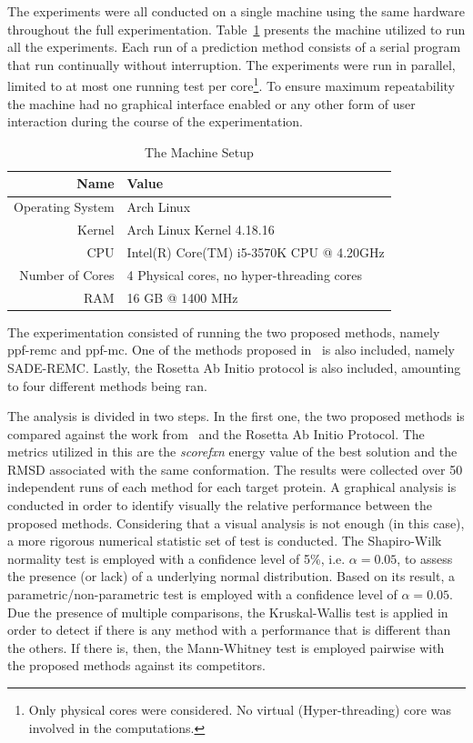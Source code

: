 The experiments were all conducted on a single machine using the same hardware
throughout the full experimentation. Table~\ref{tab:machine-setup}
presents the machine utilized to run all the experiments. Each run of a
prediction method consists of a serial program that run continually without
interruption. The experiments were run in parallel, limited to at most one
running test per core\footnote{Only physical cores were considered. No virtual
(Hyper-threading) core was involved in the computations.}. To ensure maximum
repeatability the machine had no graphical interface enabled or any other form
of user interaction during the course of the experimentation.

\begin{table}[th]
    \centering
    \begin{tabular}{r|l} \hline \hline
        Name & Value \\ \hline \hline
        Operating System & Arch Linux \\ \hline
        Kernel &  Arch Linux Kernel 4.18.16 \\ \hline
        CPU & Intel(R) Core(TM) i5-3570K CPU @ 4.20GHz \\ \hline
        Number of Cores & 4 Physical cores, no hyper-threading cores \\ \hline
        RAM & 16 GB @ 1400 MHz \\ \hline \hline
    \end{tabular}
    \caption{The Machine Setup}
    \label{tab:machine-setup}
\end{table}

The experimentation consisted of running the two proposed methods, namely
ppf-remc and ppf-mc. One of the methods proposed
in~\cite{silva2019self} is also included, namely SADE-REMC.
Lastly, the Rosetta Ab Initio protocol is also included, amounting to four
different methods being ran.

The analysis is divided in two steps. In the first one, the two proposed methods
is compared against the work from~ and the Rosetta Ab Initio
Protocol.
The metrics utilized in this are the \textit{scorefxn} energy value of the
best solution and the \ac{RMSD} associated with the same conformation. The
results were collected over 50 independent runs of each method for each target
protein. A graphical analysis is conducted in order to identify visually the
relative performance between the proposed methods. Considering that a visual
analysis is not enough (in this case), a more rigorous numerical statistic set
of test is conducted. The Shapiro-Wilk~\cite{wilk1968joint} normality test is
employed with a confidence level of 5\%, i.e. $\alpha = 0.05$, to assess the
presence (or lack) of a underlying normal distribution. Based on its result, a
parametric/non-parametric test is employed with a confidence level of $\alpha =
0.05$. Due the presence of multiple comparisons, the Kruskal-Wallis test is
applied in order to detect if there is any method with a performance that
is different than the others. If there is, then, the Mann-Whitney test is
employed pairwise with the proposed methods against its competitors.

